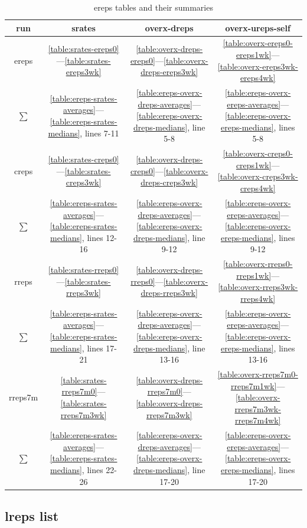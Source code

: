 \documentclass[10pt,oneside]{memoir}
\begin{document}
\begin{table}
\begin{tabular}{|cccc|}
\toprule
run & srates & overx-dreps & overx-ureps-self  \\
\midrule
ereps & \ref{table:srates-ereps0}—\ref{table:srates-ereps3wk} & \ref{table:overx-dreps-ereps0}—\ref{table:overx-dreps-ereps3wk} & \ref{table:overx-ereps0-ereps1wk}—\ref{table:overx-ereps3wk-ereps4wk} \\
$\sum$ & \ref{table:ereps-srates-averages}—\ref{table:ereps-srates-medians}, lines 7-11 & \ref{table:ereps-overx-dreps-averages}—\ref{table:ereps-overx-dreps-medians}, line 5-8 & \ref{table:ereps-overx-ereps-averages}—\ref{table:ereps-overx-ereps-medians}, lines 5-8  \\
\hline
creps & \ref{table:srates-creps0}—\ref{table:srates-creps3wk} & \ref{table:overx-dreps-creps0}—\ref{table:overx-dreps-creps3wk} & \ref{table:overx-creps0-creps1wk}—\ref{table:overx-creps3wk-creps4wk} \\
$\sum$ & \ref{table:ereps-srates-averages}—\ref{table:ereps-srates-medians}, lines 12-16 & \ref{table:ereps-overx-dreps-averages}—\ref{table:ereps-overx-dreps-medians}, line 9-12 & \ref{table:ereps-overx-ereps-averages}—\ref{table:ereps-overx-ereps-medians}, lines 9-12  \\
\hline
rreps & \ref{table:srates-rreps0}—\ref{table:srates-rreps3wk} & \ref{table:overx-dreps-rreps0}—\ref{table:overx-dreps-rreps3wk} & \ref{table:overx-rreps0-rreps1wk}—\ref{table:overx-rreps3wk-rreps4wk} \\
$\sum$ & \ref{table:ereps-srates-averages}—\ref{table:ereps-srates-medians}, lines 17-21 & \ref{table:ereps-overx-dreps-averages}—\ref{table:ereps-overx-dreps-medians}, line 13-16 & \ref{table:ereps-overx-ereps-averages}—\ref{table:ereps-overx-ereps-medians}, lines 13-16  \\
\hline
rreps7m & \ref{table:srates-rreps7m0}—\ref{table:srates-rreps7m3wk} & \ref{table:overx-dreps-rreps7m0}—\ref{table:overx-dreps-rreps7m3wk} & \ref{table:overx-rreps7m0-rreps7m1wk}—\ref{table:overx-rreps7m3wk-rreps7m4wk} \\
$\sum$ & \ref{table:ereps-srates-averages}—\ref{table:ereps-srates-medians}, lines 22-26 & \ref{table:ereps-overx-dreps-averages}—\ref{table:ereps-overx-dreps-medians}, line 17-20 & \ref{table:ereps-overx-ereps-averages}—\ref{table:ereps-overx-ereps-medians}, lines 17-20  \\
\hline
\bottomrule
\end{tabular}
\caption{ereps tables and their summaries}
\label{table:ereps-tables}
\end{table}
\pagebreak \subsection{lreps list}
\label{lrepslist}
\end{document}
